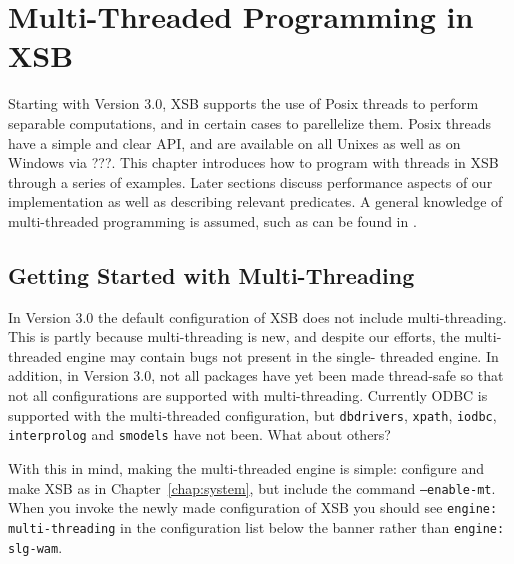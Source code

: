 \chapter{Multi-Threaded Programming in XSB} \label{chap:threads}

Starting with Version 3.0, XSB supports the use of Posix threads to
perform separable computations, and in certain cases to parellelize
them.  Posix threads have a simple and clear API, and are available on
all Unixes as well as on Windows via ???.  This chapter introduces how
to program with threads in XSB through a series of examples.  Later
sections discuss performance aspects of our implementation as well as
describing relevant predicates.  A general knowledge of multi-threaded
programming is assumed, such as can be found in \cite{LewB98,Bute97}.

\section{Getting Started with Multi-Threading}
%
In Version 3.0 the default configuration of XSB does not include
multi-threading.  This is partly because multi-threading is new, and
despite our efforts, the multi-threaded engine may contain bugs not
present in the single-
threaded engine.  In addition, in Version 3.0,
not all packages have yet been made thread-safe so that not all
configurations are supported with multi-threading.  Currently ODBC is
supported with the multi-threaded configuration, but {\tt dbdrivers},
{\tt xpath}, {\tt iodbc}, {\tt interprolog} and {\tt smodels} have not
been. {\sf What about others?}

With this in mind, making the multi-threaded engine is simple:
configure and make XSB as in Chapter~\ref{chap:system}, but include
the command {\tt --enable-mt}.  When you invoke the newly made
configuration of XSB you should see {\tt engine: multi-threading} in
the configuration list below the banner rather than {\tt engine:
  slg-wam}.

